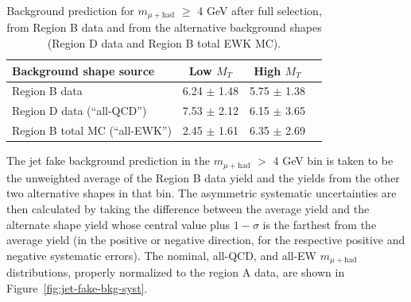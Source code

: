 \begin{table}
\begin{center}
  \caption{Background prediction for $m_{\mu+\text{had}}$ $\geq$ 4 GeV after full selection, from Region B data and from the alternative background shapes (Region D data and Region B total EWK MC).}\label{tab:jet-fake-bkg-altyields}
\begin{tabular}{|m{6cm}|c|c|c|}
  \hline
  Background shape source & Low $M_{T}$ & High $M_{T}$ \\
  \hline
  \hline
  Region B data & 6.24 $\pm$ 1.48 & 5.75 $\pm$ 1.38 \\
  Region D data (``all-QCD'') & 7.53 $\pm$ 2.12 & 6.15 $\pm$ 3.65 \\
  Region B total MC (``all-EWK'') & 2.45 $\pm$ 1.61 & 6.35 $\pm$ 2.69 \\
  \hline
\end{tabular}
\end{center}
\end{table}

The jet fake background prediction in the $m_{\mu+\text{had}}$ $>$ 4 GeV bin is taken to be the unweighted average of the Region B data yield and the yields from the other two alternative shapes in that bin. The asymmetric systematic uncertainties are then calculated by taking the difference between the average yield and the alternate shape yield whose central value plus $1-\sigma$ is the farthest from the average yield (in the positive or negative direction, for the respective positive and negative systematic errors).
The nominal, all-QCD, and all-EW $m_{\mu+\text{had}}$ distributions, properly normalized to the region A data, are shown in Figure~\ref{fig:jet-fake-bkg-syst}.

